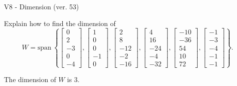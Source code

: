 \begin{exercise}
  \begin{exerciseTitle}V8 - Dimension (ver. 53)\end{exerciseTitle}
  \begin{exerciseStatement}
    Explain how to find the dimension of 
\[W=\mathrm{span}\ \left\{\left[\begin{array}{r}
0 \\
2 \\
-3 \\
0 \\
-4
\end{array}\right] , \left[\begin{array}{r}
1 \\
0 \\
0 \\
-1 \\
0
\end{array}\right] , \left[\begin{array}{r}
2 \\
8 \\
-12 \\
-2 \\
-16
\end{array}\right] , \left[\begin{array}{r}
4 \\
16 \\
-24 \\
-4 \\
-32
\end{array}\right] , \left[\begin{array}{r}
-10 \\
-36 \\
54 \\
10 \\
72
\end{array}\right] , \left[\begin{array}{r}
-1 \\
-3 \\
-4 \\
-1 \\
-1
\end{array}\right]\right\}.\]



  \end{exerciseStatement}
  \begin{exerciseAnswer}
   The dimension of \(W\) is  \(3\).
  


  \end{exerciseAnswer}
\end{exercise}